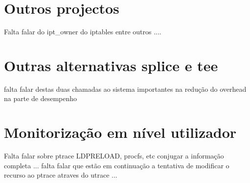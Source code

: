 \section{Outros projectos}

Falta falar do ipt\_owner do iptables entre outros ....


\section{Outras alternativas splice e tee}

falta falar destas duas chamadas ao sistema importantes na redução do overhead na parte de desempenho

\section{Monitorização em nível utilizador}

Falta falar sobre ptrace LDPRELOAD, procfs, etc conjugar a informação completa ... falta falar que estão em continuação a tentativa de modificar o recurso ao ptrace atraves do utrace ... 
